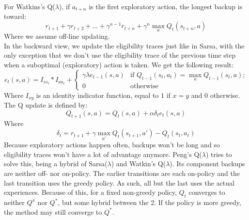 \documentclass[a4paper]{article}
\begin{document}
For Watkins's Q($\lambda$), if $a_{t+n}$ is the first exploratory action, the longest backup is toward:
\begin{equation}
r_{t+1} + \gamma r_{t+2} + \dots + \gamma^{n-1} r_{t+n} + \gamma^n \max_a Q_t(s_{t+n},a)
\end{equation}
Where we assume off-line updating.\\
In the backward view, we update the eligibility traces just like in Sarsa, with the only exception that we don't use the eligibility trace of the previous time step when a suboptimal (exploratory) action is taken. We get the following result:
\begin{equation}
e_t(s,a) = I_{s s_t} * I_{a a_t} + \begin{cases}
	\gamma \lambda e_{t-1}(s,a) & \text{if $Q_{t-1}(s_t,a_t) = \max_a Q_{t-1}(s_t,a)$;} \\
    0 & \text{otherwise}
\end{cases}
\end{equation}
Where $I_{xy}$ is an identity indicator function, equal to $1$ if $x=y$ and $0$ otherwise. The Q update is defined by:
\begin{equation}
Q_{t+1}(s,a) = Q_t(s,a) + \alpha \delta_t e_t(s,a)
\end{equation}
Where
\begin{equation}
\delta_t = r_{t+1} + \gamma \max_{a'} Q_t(s_{t+1}, a') - Q_t(s_t,a_t)
\end{equation}
Because exploratory actions happen often, backups won't be long and so eligibility traces won't have a lot of advantage anymore. Peng's Q($\lambda$) tries to solve this, being a hybrid of Sarsa($\lambda$) and Watkin's Q($\lambda$). Its component backups are neither off- nor on-policy. The earlier transitions are each on-policy and the last transition uses the greedy policy. As such, all but the last uses the actual experiences. Because of this, for a fixed non-greedy policy, $Q_t$ converges to neither $Q^{\pi}$ nor $Q^{*}$, but some hybrid between the 2. If the policy is more greedy, the method may still converge to $Q^{*}$.\\
\end{document}

